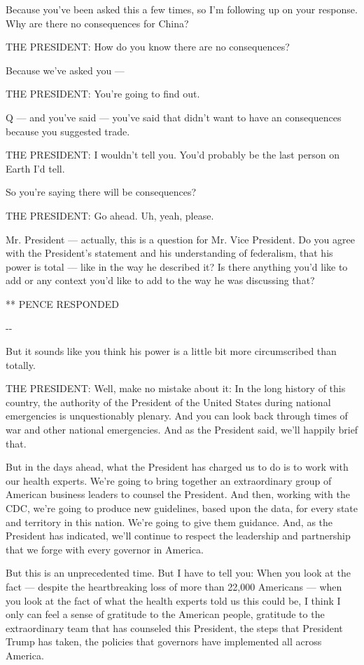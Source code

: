 Because you've been asked this a few times, so I'm following up on your
response. Why are there no consequences for China?

THE PRESIDENT: How do you know there are no consequences?

Because we've asked you ---

THE PRESIDENT: You're going to find out.

Q --- and you've said --- you've said that didn't want to have an
consequences because you suggested trade.

THE PRESIDENT: I wouldn't tell you. You'd probably be the last person on
Earth I'd tell.

So you're saying there will be consequences?

THE PRESIDENT: Go ahead. Uh, yeah, please.

Mr. President --- actually, this is a question for Mr. Vice President.
Do you agree with the President's statement and his understanding of
federalism, that his power is total --- like in the way he described it?
Is there anything you'd like to add or any context you'd like to add to
the way he was discussing that?

** PENCE RESPONDED

-\/-

But it sounds like you think his power is a little bit more
circumscribed than totally.

THE PRESIDENT: Well, make no mistake about it: In the long history of
this country, the authority of the President of the United States during
national emergencies is unquestionably plenary. And you can look back
through times of war and other national emergencies. And as the
President said, we'll happily brief that.

But in the days ahead, what the President has charged us to do is to
work with our health experts. We're going to bring together an
extraordinary group of American business leaders to counsel the
President. And then, working with the CDC, we're going to produce new
guidelines, based upon the data, for every state and territory in this
nation. We're going to give them guidance. And, as the President has
indicated, we'll continue to respect the leadership and partnership that
we forge with every governor in America.

But this is an unprecedented time. But I have to tell you: When you look
at the fact --- despite the heartbreaking loss of more than 22,000
Americans --- when you look at the fact of what the health experts told
us this could be, I think I only can feel a sense of gratitude to the
American people, gratitude to the extraordinary team that has counseled
this President, the steps that President Trump has taken, the policies
that governors have implemented all across America.

